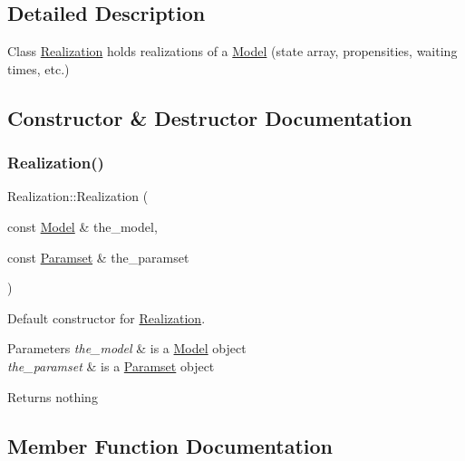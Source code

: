 \subsection{Detailed Description}
Class \hyperlink{class_realization}{Realization} holds realizations of a \hyperlink{class_model}{Model} (state array, propensities, waiting times, etc.) 

\subsection{Constructor \& Destructor Documentation}
\mbox{\label{class_realization_a599b405e69cc9dd43fc66b9b58a41ba8}} 
\subsubsection{\texorpdfstring{Realization()}{Realization()}}
{\footnotesize\ttfamily Realization\+::\+Realization (\begin{DoxyParamCaption}\item[{const \hyperlink{class_model}{Model} \&}]{the\+\_\+model,  }\item[{const \hyperlink{class_paramset}{Paramset} \&}]{the\+\_\+paramset }\end{DoxyParamCaption})}



Default constructor for \hyperlink{class_realization}{Realization}. 


\begin{DoxyParams}{Parameters}
{\em the\+\_\+model} & is a \hyperlink{class_model}{Model} object \\
\hline
{\em the\+\_\+paramset} & is a \hyperlink{class_paramset}{Paramset} object \\
\hline
\end{DoxyParams}
\begin{DoxyReturn}{Returns}
nothing 
\end{DoxyReturn}


\subsection{Member Function Documentation}
\mbox{\label{class_realization_a0856e7aef37514c6ae1b685e6a436a38}} 
